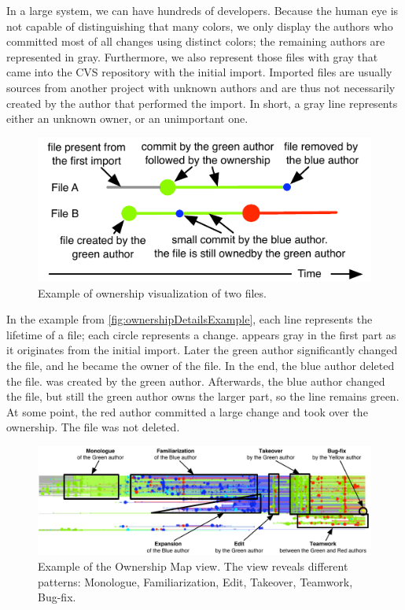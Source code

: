 In a large system, we can have hundreds of developers. Because the human eye is not capable of distinguishing that many colors, we only display the authors who committed most of all changes using distinct colors; the remaining authors are represented in gray. Furthermore, we also represent those files with gray that came into the CVS repository with the initial import. Imported files are usually sources from another project with unknown authors and are thus not necessarily created by the author that performed the import. In short, a gray line represents either an unknown owner, or an unimportant one.

\begin{figure}[htb]
\begin{center}
\includegraphics[width=\linewidth]{fig/hapax-owners-map-detail.pdf}
\caption{Example of ownership visualization of two files.}
\label{fig:ownershipDetailsExample}
\end{center}
\end{figure}

In the example from \autoref{fig:ownershipDetailsExample}, each line represents the lifetime of a file; each circle represents a change.  appears gray in the first part as it originates from the initial import. Later the green author significantly changed the file, and he became the owner of the file. In the end, the blue author deleted the file.  was created by the green author. Afterwards, the blue author changed the file, but still the green author owns the larger part, so the line remains green. At some point, the red author committed a large change and took over the ownership. The file was not deleted.

\begin{figure}[hbt]
\begin{center}
\includegraphics[width=\linewidth]{fig/hapax-owners-map-example}
\caption{Example of the Ownership Map view. The view reveals different patterns:
Monologue, Familiarization, Edit, Takeover, Teamwork, Bug-fix.}
\label{fig:ownershipMapExample}
\end{center}
\end{figure}

